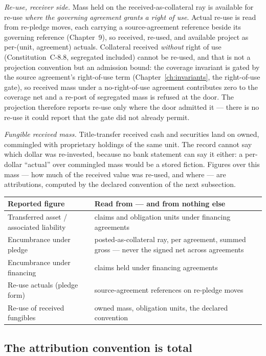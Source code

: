 \documentclass[11pt,a4paper]{article}
\begin{document}
\emph{Re-use, receiver side.} Mass held on the received-as-collateral ray is
available for re-use \emph{where the governing agreement grants a right of use}.
Actual re-use is read from re-pledge moves, each carrying a source-agreement reference
beside its governing reference (Chapter~9), so received, re-used, and available project as
per-(unit, agreement) actuals. Collateral received \emph{without} right of use
(Constitution~C-8.8, segregated included) cannot be re-used, and that is not a projection
convention but an admission bound: the coverage invariant is gated by the source
agreement's right-of-use term (Chapter~\ref{ch:invariants}, the right-of-use gate), so
received mass under a no-right-of-use agreement contributes zero to the coverage net and a
re-post of segregated mass is refused at the door. The projection therefore reports re-use
only where the door admitted it --- there is no re-use it could report that the gate did
not already permit.

\emph{Fungible received mass.} Title-transfer received cash and securities land
on owned, commingled with proprietary holdings of the same unit. The record
cannot say which dollar was re-invested, because no bank statement can say it
either: a per-dollar ``actual'' over commingled mass would be a stored fiction.
Figures over this mass --- how much of the received value was re-used, and where
--- are attributions, computed by the declared convention of the next
subsection.

\begin{center}
\begin{tabular}{@{}ll@{}}
\toprule
Reported figure & Read from --- and from nothing else \\
\midrule
Transferred asset / associated liability & claims and obligation units under financing agreements \\
Encumbrance under pledge & posted-as-collateral ray, per agreement, summed gross --- never the signed net across agreements \\
Encumbrance under financing & claims held under financing agreements \\
Re-use actuals (pledge form) & source-agreement references on re-pledge moves \\
Re-use of received fungibles & owned mass, obligation units, the declared convention \\
\bottomrule
\end{tabular}
\end{center}

\subsection{The attribution convention is total}
\end{document}
